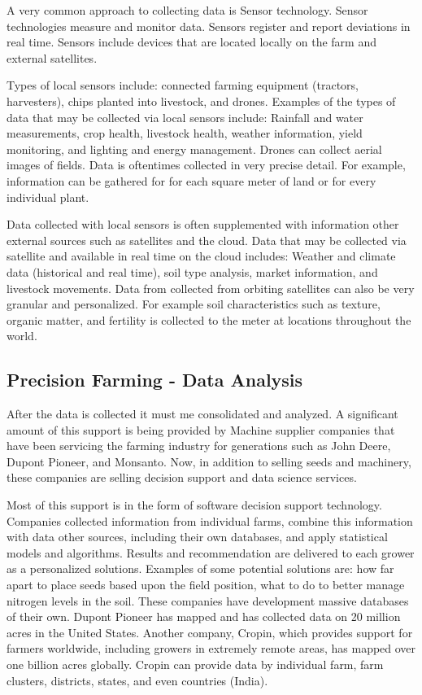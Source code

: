 \documentclass[sigconf]{acmart}
\begin{document}
A very common approach to collecting data is Sensor technology. Sensor technologies measure and monitor data.  Sensors register and report deviations in real time. Sensors include devices that are located locally on the farm and external satellites. 

Types of local sensors include: connected farming equipment (tractors, harvesters), chips planted into livestock, and drones. Examples of the types of data that may be collected via local sensors include: Rainfall and water measurements, crop health, livestock health, weather information, yield monitoring, and lighting and energy management. Drones can collect aerial images of fields. Data is oftentimes collected in very precise detail. For example, information can be gathered for for each square meter of land or for every individual plant. 

Data collected with local sensors is often supplemented with information other external sources such as satellites and the cloud. Data that may be collected via satellite and available in real time on the cloud includes: Weather and climate data (historical and real time), soil type analysis, market information, and livestock movements. Data from collected from orbiting satellites can also be very granular and personalized. For example soil characteristics such as texture, organic matter, and fertility is collected to the meter at locations throughout the world. 

\subsection{Precision Farming - Data Analysis}

After the data is collected it must me consolidated and analyzed. A significant amount of this support is being provided by Machine supplier companies that have been servicing the farming industry for generations such as John Deere, Dupont Pioneer, and Monsanto. Now, in addition to selling seeds and machinery, these companies are selling decision support and data science services.

Most of this support is in the form of software decision support technology.  Companies collected information from individual farms, combine this information with data other sources, including their own databases, and apply statistical  models and algorithms. Results and recommendation are delivered to each grower as a personalized solutions. Examples of some potential solutions are: how far apart to place seeds based upon the field position, what to do to better manage nitrogen levels in the soil. These companies have development massive databases of their own.  Dupont Pioneer has mapped and has collected data on 20 million acres in the United States. Another company, Cropin, which provides support for farmers worldwide, including growers in extremely remote areas, has mapped over one billion acres globally. Cropin can provide data by individual farm, farm clusters, districts, states, and even countries (India).
\end{document}
